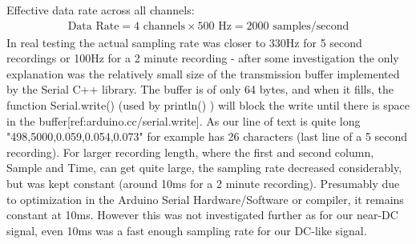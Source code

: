 Effective data rate across all channels:
\begin{equation} \label{EffectiveDATArate}
  \begin{split}
\text{Data Rate} = 4 \text{ channels} \times 500 \text{ Hz} = 2000 \text{ samples/second}
\end{split}
\end{equation}
In real testing the actual sampling rate was closer to 330Hz for 5 second recordings or 100Hz for a 2 minute recording - after some investigation the only explanation was the relatively small size of the transmission buffer implemented by the Serial C++ library. The buffer is of only 64 bytes, and when it fills, the function Serial.write() (used by println() ) will block the write until there is space in the buffer[ref:arduino.cc/serial.write]. As our line of text is quite long "498,5000,0.059,0.054,0.073" for example has 26 characters (last line of a 5 second recording). For larger recording length, where the first and second column, Sample and Time, can get quite large, the sampling rate decreased considerably, but was kept constant (around 10ms for a 2 minute recording). Presumably due to optimization in the Arduino Serial Hardware/Software or compiler, it remains constant at 10ms. However this was not investigated further as for our near-DC signal, even 10ms was a fast enough sampling rate for our DC-like signal.


